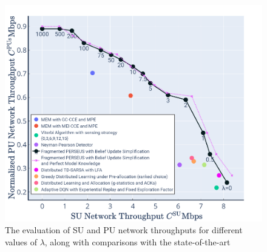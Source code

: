 \documentclass[12pt, draftcls, onecolumn]{IEEEtran}
\begin{document}
\begin{figure} [htb]
    \centerline{
    \includegraphics[width = 1.0\textwidth]{Throughput_and_Interference_with_DQN.png}}
    \caption{The evaluation of SU and PU network throughputs for different values of $\lambda$, along with comparisons with the state-of-the-art}
    \label{Fig. 4}
\end{figure}
\end{document}
